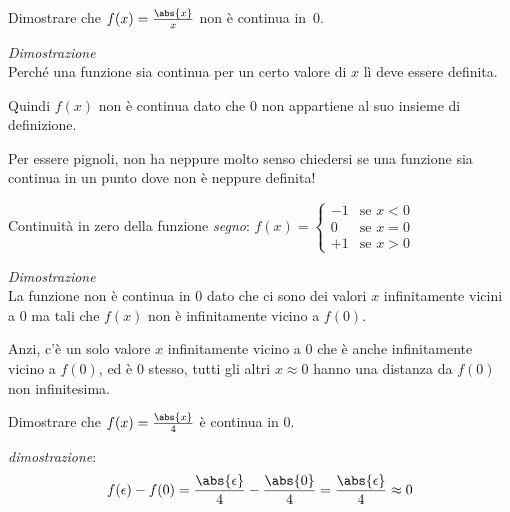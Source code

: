 \begin{esempio}
Dimostrare che \(f(x)=\frac{\abs{x}}{x}\) non è continua in~0.

{
\emph{Dimostrazione}\\
Perché una funzione sia continua per un certo valore di \(x\) 
lì deve essere definita. 

Quindi \(f(x)\) non è continua dato che \(0\) non appartiene al suo insieme 
di definizione.

Per essere pignoli, non ha neppure molto senso chiedersi se una funzione sia 
continua in un punto dove non è neppure definita!
}{
\scalebox{1}{\contsecondo}
}
\end{esempio}


\begin{esempio}
Continuità in zero della funzione \emph{segno}:
\(f(x)=\begin{cases} 
    -1 & \text{se } x < 0 \\ 
     0 & \text{se } x = 0 \\ 
    +1 & \text{se } x > 0
  \end{cases}
\)

{
\emph{Dimostrazione}\\
La funzione non è continua in \(0\) dato che ci sono dei valori 
\(x\) infinitamente vicini a \(0\) ma tali che \(f(x)\) non è infinitamente 
vicino a \(f(0)\). 

Anzi, c'è un solo valore \(x\) infinitamente vicino a \(0\) che è anche 
infinitamente vicino a \(f(0)\), ed è \(0\) stesso, tutti gli altri 
\(x \approx 0\) hanno una distanza da \(f(0)\)  non infinitesima.
}{
\scalebox{1}{\fsegno}
}
\end{esempio}

{
\begin{esempio}
 Dimostrare che \(f(x)=\frac{\abs{x}}{4}\) è continua in \(0\).

\emph{dimostrazione}:
\[f(\epsilon) - f(0) = \frac{\abs{\epsilon}}{4} - \frac{\abs{0}}{4} = 
 \frac{\abs{\epsilon}}{4} \approx 0\]
\end{esempio}
}{
\scalebox{1}{\contterzo}
}

